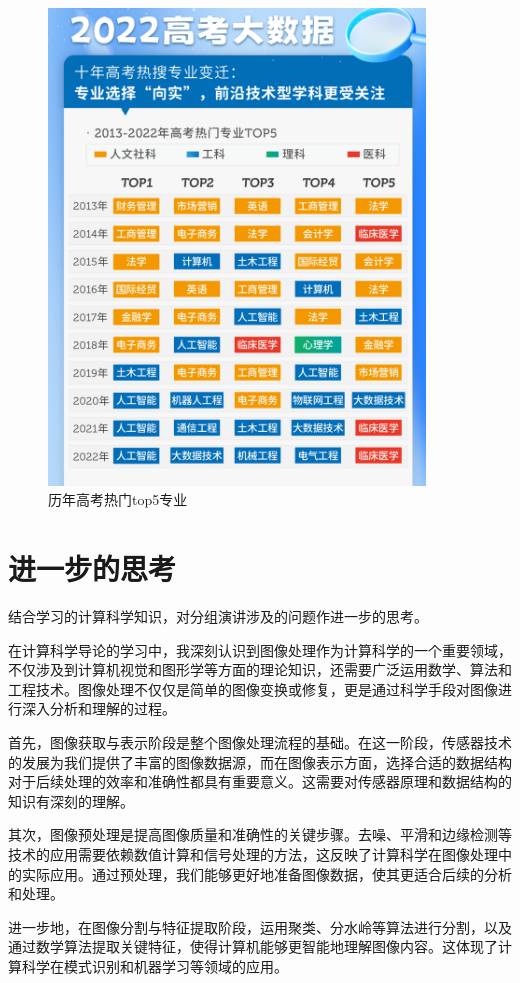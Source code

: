 \documentclass[square]{article}
\begin{document}
\begin{enumerate}
	\begin{figure}[h!]
		\centering
		\includegraphics[width=10cm]{gaokao.png}
		\caption{历年高考热门top5专业}
		\label{fig:gaokao}
	\end{figure}
\end{enumerate}


\section{进一步的思考}
结合学习的计算科学知识，对分组演讲涉及的问题作进一步的思考。\par
在计算科学导论的学习中，我深刻认识到图像处理作为计算科学的一个重要领域，不仅涉及到计算机视觉和图形学等方面的理论知识，还需要广泛运用数学、算法和工程技术。图像处理不仅仅是简单的图像变换或修复，更是通过科学手段对图像进行深入分析和理解的过程。

首先，图像获取与表示阶段是整个图像处理流程的基础。在这一阶段，传感器技术的发展为我们提供了丰富的图像数据源，而在图像表示方面，选择合适的数据结构对于后续处理的效率和准确性都具有重要意义。这需要对传感器原理和数据结构的知识有深刻的理解。

其次，图像预处理是提高图像质量和准确性的关键步骤。去噪、平滑和边缘检测等技术的应用需要依赖数值计算和信号处理的方法，这反映了计算科学在图像处理中的实际应用。通过预处理，我们能够更好地准备图像数据，使其更适合后续的分析和处理。

进一步地，在图像分割与特征提取阶段，运用聚类、分水岭等算法进行分割，以及通过数学算法提取关键特征，使得计算机能够更智能地理解图像内容。这体现了计算科学在模式识别和机器学习等领域的应用。
\end{document}
